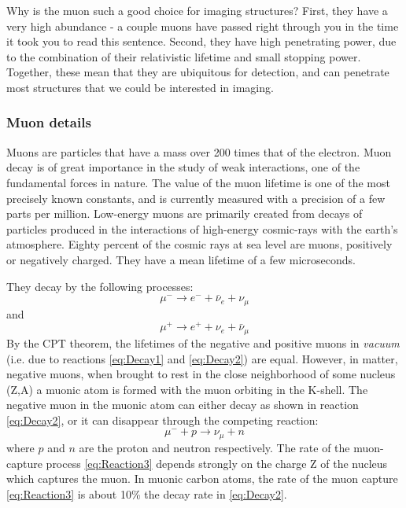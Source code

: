 \documentclass{../lab}
\begin{document}
Why is the muon such a good choice for imaging structures? First, they have a very high abundance - a couple muons have passed right through you in the time it took you to read this sentence. Second, they have high penetrating power, due to the combination of their relativistic lifetime and small stopping power. Together, these mean that they are ubiquitous for detection, and can penetrate most structures that we could be interested in imaging.

\subsubsection{Muon details}
Muons are particles that have a mass over 200 times that of the electron. Muon decay is of great importance in the study of weak interactions, one of the fundamental forces in nature. The value of the muon lifetime is one of the most precisely known constants, and is currently measured with a precision of a few parts per million. Low-energy muons are primarily created from decays of particles produced in the interactions of high-energy cosmic-rays with the earth's atmosphere. Eighty percent of the cosmic rays at sea level are muons, positively or negatively charged. They have a mean lifetime of a few microseconds.

They decay by the following processes:
\begin{equation}
\label{eq:Decay1}
    \mu^-\rightarrow e^-+\bar{\nu}_e+\nu_\mu
\end{equation}
and
\begin{equation}
\label{eq:Decay2}
    \mu^+\rightarrow e^++\nu_e+\bar{\nu}_\mu
\end{equation}
By the CPT theorem, the lifetimes of the negative and positive muons in \emph{vacuum} (i.e. due to reactions \eqref{eq:Decay1} and \eqref{eq:Decay2}) are equal. However, in matter, negative muons, when brought to rest in the close neighborhood of some nucleus (Z,A) a muonic atom is formed with the muon orbiting in the K-shell. The negative muon in the muonic atom can either decay as shown in reaction \eqref{eq:Decay2}, or it can disappear through the competing reaction:
\begin{equation}
\label{eq:Reaction3}
    \mu^- + p \rightarrow \nu_{\mu}+n
\end{equation}
where $p$ and $n$ are the proton and neutron respectively.
The rate of the muon-capture process \eqref{eq:Reaction3} depends strongly on the charge Z of the nucleus which captures the muon. In muonic carbon atoms, the rate of the muon capture \eqref{eq:Reaction3} is about 10\% the decay rate in \eqref{eq:Decay2}.
\end{document}
